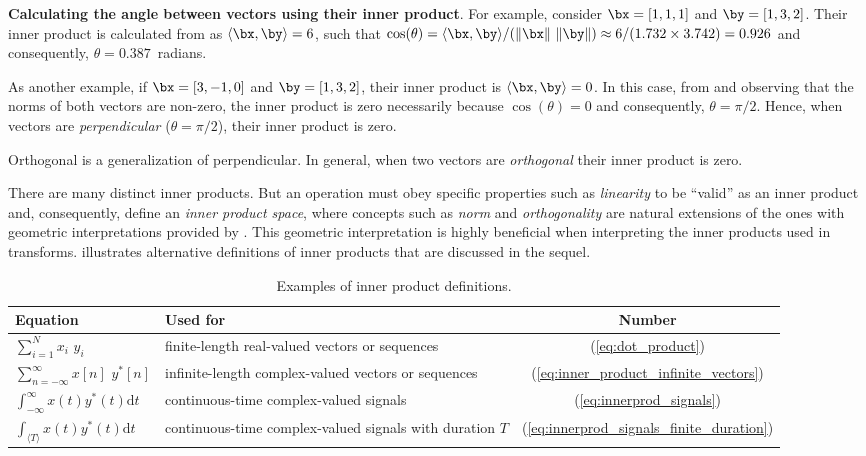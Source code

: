 \bExample \textbf{Calculating the angle between vectors using their inner product}.
For example, 
consider $\bx=[1,1,1]$ and $\by=[1,3,2]$. Their inner product is calculated from  as $\langle\bx,\by\rangle=6$, such that $\cos(\theta)=\langle\bx,\by\rangle / (\lVert\bx\rVert~\lVert\by\rVert) \approx 6/(1.732 \times 3.742) = 0.926$ and consequently, $\theta=0.387$~radians.

As another example, if $\bx=[3,-1,0]$ and $\by=[1,3,2]$, their inner product is $\langle\bx,\by\rangle=0$. In this case, from  and observing that the norms of both vectors are non-zero, the inner product is zero necessarily because $\cos(\theta)=0$ and consequently, $\theta=\pi/2$. Hence, when vectors are \emph{perpendicular} ($\theta=\pi/2$), their inner product is zero.
\eExample 

Orthogonal is a generalization of perpendicular.
In general, when two vectors are \emph{orthogonal} their inner product is zero.

There are many distinct inner products. But an operation must obey specific properties such as \emph{linearity} to be ``valid'' as an inner product and, consequently, define an \emph{inner product space}, where concepts such as \emph{norm} and \emph{orthogonality} are natural extensions of the ones with geometric interpretations provided by . This geometric interpretation is highly beneficial when interpreting the inner products used in transforms.
 illustrates alternative definitions of inner products that are discussed in the sequel. 

\begin{table}
 \centering
 \caption{Examples of inner product definitions.\label{tab:inner_products}}
 \begin{tabularx}{\textwidth}{p{3cm}Xc}
 \toprule
 \textbf{Equation} & \textbf{Used for} & \textbf{Number} \\ \midrule
$\sum_{i=1}^N x_i \textrm{~} y_i$ & finite-length real-valued vectors or sequences & (\ref{eq:dot_product}) \\
$\sum_{n=-\infty }^\infty x[n] \textrm{~} y^*[n]$ &  infinite-length complex-valued vectors or sequences & (\ref{eq:inner_product_infinite_vectors}) \\
$\int_{-\infty}^\infty x(t)y^*(t) \textrm{d}t$ & continuous-time complex-valued signals & (\ref{eq:innerprod_signals}) \\
$\int_{\langle T\rangle} x(t)y^*(t) \textrm{d}t$ & continuous-time complex-valued signals with duration $T$ & (\ref{eq:innerprod_signals_finite_duration}) \\ \bottomrule
\end{tabularx}
\end{table}

